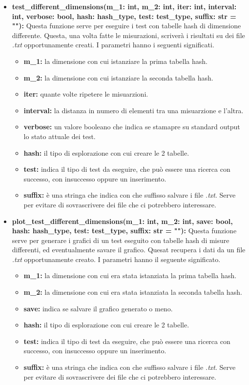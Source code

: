\documentclass{article}
\newcommand{\newlineitem}[1]{\item \textbf{#1} \hfill \break}
\begin{document}
\begin{itemize}
\newlineitem{test\_different\_dimensions(m\_1: int, m\_2: int, iter: int, interval: int, verbose: bool, hash: hash\_type, test: test\_type, suffix: str = ""):}
Questa funzione serve per eseguire i test con tabelle hash di dimensione differente. Questa, una volta fatte le misurazioni, scriverà i risultati su dei file \emph{.txt} opportunamente creati. I parametri hanno i seguenti significati.
\begin{itemize}
\item \textbf{m\_1:} la dimensione con cui istanziare la prima tabella hash.
\item \textbf{m\_2:} la dimensione con cui istanziare la seconda tabella hash.
\item \textbf{iter:} quante volte ripetere le misuarzioni.
\item \textbf{interval:} la distanza in numero di elementi tra una misuarzione e l'altra.
\item \textbf{verbose:} un valore booleano che indica se stamapre su standard output lo stato attuale dei test.
\item \textbf{hash:} il tipo di esplorazione con cui creare le 2 tabelle.
\item \textbf{test:} indica il tipo di test da eseguire, che può essere una ricerca con successo, con insuccesso oppure un inserimento.
\item \textbf{suffix:} è una stringa che indica con che suffisso salvare i file \emph{.txt}. Serve per evitare di sovrascrivere dei file che ci potrebbero interessare.
\end{itemize}
\newlineitem{plot\_test\_different\_dimensions(m\_1: int, m\_2: int, save: bool, hash: hash\_type, test: test\_type, suffix: str = ""):}
Questa funzione serve per generare i grafici di un test eseguito con tabelle hash di misure differenti, ed eventualmente savare il grafico. Quesat recupera i dati da un file \emph{.txt} opportunamente creato. I parametri hanno il seguente significato.
\begin{itemize}
\item \textbf{m\_1:} la dimensione con cui era stata istanziata la prima tabella hash.
\item \textbf{m\_2:} la dimensione con cui era stata istanziata la seconda tabella hash.
\item \textbf{save:} indica se salvare il grafico generato o meno.
\item \textbf{hash:} il tipo di esplorazione con cui creare le 2 tabelle.
\item \textbf{test:} indica il tipo di test da eseguire, che può essere una ricerca con successo, con insuccesso oppure un inserimento.
\item \textbf{suffix:} è una stringa che indica con che suffisso salvare i file \emph{.txt}. Serve per evitare di sovrascrivere dei file che ci potrebbero interessare.
\end{itemize}


\end{itemize}
\end{document}
